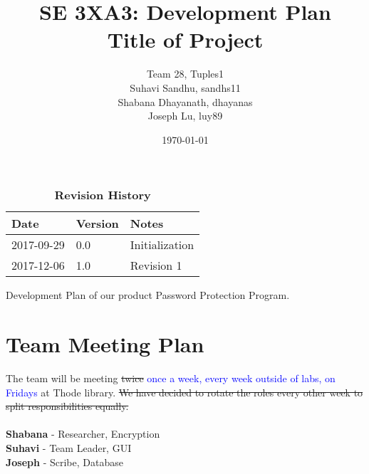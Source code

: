 \documentclass{article}
\title{SE 3XA3: Development Plan\\Title of Project}
\author{Team 28, Tuples1
		\\ Suhavi Sandhu, sandhs11
		\\ Shabana Dhayanath, dhayanas
		\\ Joseph Lu, luy89
}
\date{\today}
\begin{document}
\maketitle

\newpage

\tableofcontents
\listoftables

\begin{table}[bp]
\caption{\bf Revision History} \label{TblRevisionHistory}
\begin{tabularx}{\textwidth}{p{3cm}p{2cm}X}
\toprule {\bf Date} & {\bf Version} & {\bf Notes}\\
\midrule
2017-09-29 & 0.0 & Initialization\\
2017-12-06 & 1.0 & Revision 1\\
\bottomrule
\end{tabularx}
\end{table}



\newpage


Development Plan of our product Password Protection Program.

\section{Team Meeting Plan}
The team will be meeting \sout{twice} \textcolor{blue}{once a week, every week outside of labs, on Fridays} at Thode library. \sout{We have decided to rotate the roles every other week to split responsibilities equally.}\\\\
\textbf{Shabana} - Researcher, Encryption\\
\textbf{Suhavi} - Team Leader, GUI\\
\textbf{Joseph} - Scribe, Database\\

\end{document}
